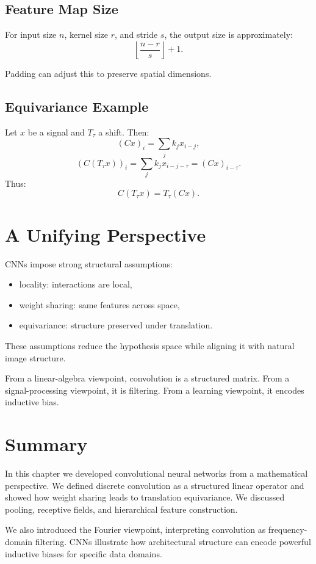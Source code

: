 \subsection{Feature Map Size}

For input size $n$, kernel size $r$, and stride $s$, the output size is approximately:
\[
\left\lfloor \frac{n - r}{s} \right\rfloor + 1.
\]

Padding can adjust this to preserve spatial dimensions.

\subsection{Equivariance Example}

Let $x$ be a signal and $T_\tau$ a shift. Then:
\[
(Cx)_i = \sum_j k_j x_{i-j},
\]
\[
(C(T_\tau x))_i = \sum_j k_j x_{i-j-\tau} = (Cx)_{i-\tau}.
\]
Thus:
\[
C(T_\tau x) = T_\tau(Cx).
\]

\section{A Unifying Perspective}

CNNs impose strong structural assumptions:
\begin{itemize}
    \item locality: interactions are local,
    \item weight sharing: same features across space,
    \item equivariance: structure preserved under translation.
\end{itemize}

These assumptions reduce the hypothesis space while aligning it with natural image structure.

From a linear-algebra viewpoint, convolution is a structured matrix. From a signal-processing viewpoint, it is filtering. From a learning viewpoint, it encodes inductive bias.

\section{Summary}

In this chapter we developed convolutional neural networks from a mathematical perspective. We defined discrete convolution as a structured linear operator and showed how weight sharing leads to translation equivariance. We discussed pooling, receptive fields, and hierarchical feature construction.

We also introduced the Fourier viewpoint, interpreting convolution as frequency-domain filtering. CNNs illustrate how architectural structure can encode powerful inductive biases for specific data domains.